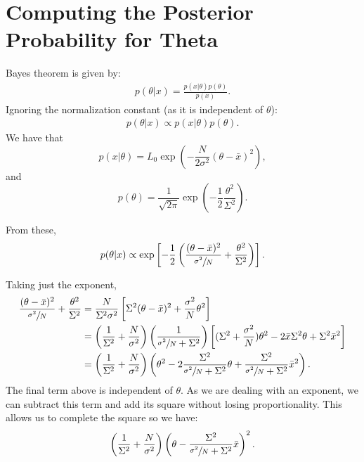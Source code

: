 \documentclass[a4paper,11pt,twoside]{article}
\begin{document}
\section{Computing the Posterior Probability for Theta}
Bayes theorem is given by:
\begin{align*}
	p(\theta|x) = \frac{p(x|\theta)p(\theta)}{p(x)}.
\end{align*}
Ignoring the normalization constant (as it is independent of $\theta$):
\begin{align*}
	p(\theta|x) \propto p(x|\theta)p(\theta).
\end{align*}
We have that
\begin{equation*}
	p(x|\theta) = L_0 \exp \left( -\frac{N}{2 \sigma^2} (\theta - \bar{x})^2 \right),
\end{equation*}
and
\begin{equation*}
	p(\theta) =  \frac{1}{\sqrt{2\pi}}\exp\left(-\frac{1}{2}\frac{\theta^2}{\Sigma^2}\right).
\end{equation*}

From these,
\begin{equation*}
	p(\theta|x) \propto \exp \left[ -\frac{1}{2} \left( \frac{(\theta - \bar{x})^2}{\sfrac{\sigma^2}{N}} +\frac{\theta^2}{\Sigma^2} \right) \right].
\end{equation*}

Taking just the exponent,
\begin{align*}
	\frac{(\theta - \bar{x})^2}{\sfrac{\sigma^2}{N}} + \frac{\theta^2}{\Sigma^2} &= \frac{N}{\Sigma^2\sigma^2} \left[\Sigma^2 (\theta - \bar{x})^2 + \frac{\sigma^2}{N} \theta^2 \right]
	\\ &= \left( \frac{1}{\Sigma^2} + \frac{N}{\sigma^2} \right) \left( \frac{1}{\sfrac{\sigma^2}{N} + \Sigma^2} \right) \left[ (\Sigma^2 + \frac{\sigma^2}{N})\theta^2 - 2\bar{x}\Sigma^2\theta + \Sigma^2\bar{x}^2 \right]
	\\ &= \left( \frac{1}{\Sigma^2} + \frac{N}{\sigma^2} \right) \left( \theta^2 - 2 \frac{\Sigma^2}{\sfrac{\sigma^2}{N} + \Sigma^2} \theta + \frac{\Sigma^2}{\sfrac{\sigma^2}{N} + \Sigma^2} \bar{x}^2 \right).
\end{align*}
The final term above is independent of $\theta$. As we are dealing with an exponent, we can subtract this term and add its square without losing proportionality. This allows us to complete the square so we have:
\begin{equation*}
	\left( \frac{1}{\Sigma^2} + \frac{N}{\sigma^2} \right) \left( \theta - \frac{\Sigma^2}{\sfrac{\sigma^2}{N} + \Sigma^2} \bar{x} \right)^2.
\end{equation*}
\end{document}
